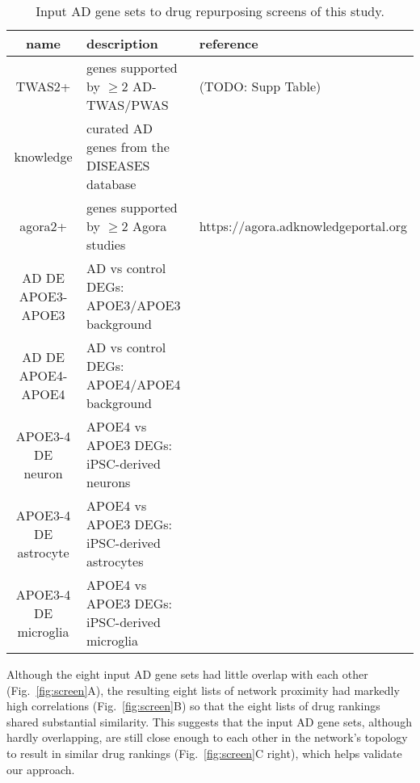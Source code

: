 \documentclass[letterpaper]{article}
\begin{document}
\begin{table}
\footnotesize
\begin{tabular}{cll}
name     & description & reference  \\
\hline
TWAS2+   & genes supported by $\ge 2$ AD-TWAS/PWAS & (TODO: Supp Table)  \\
knowledge& curated AD genes from the DISEASES database & \cite{PletscherFrankild2015} \\
agora2+  & genes supported by $\ge 2$ Agora studies & https://agora.adknowledgeportal.org \\
AD DE APOE3-APOE3 & AD vs control DEGs: APOE3/APOE3 background & \cite{Taubes2021} \\
AD DE APOE4-APOE4 & AD vs control DEGs: APOE4/APOE4 background & \cite{Taubes2021} \\
APOE3-4 DE neuron & APOE4 vs APOE3 DEGs: iPSC-derived neurons& \cite{Lin2018} \\
APOE3-4 DE astrocyte & APOE4 vs APOE3 DEGs: iPSC-derived astrocytes& \cite{Lin2018} \\
APOE3-4 DE microglia & APOE4 vs APOE3 DEGs: iPSC-derived microglia& \cite{Lin2018} \\
\end{tabular}
\caption{
Input AD gene sets to drug repurposing screens of this study.
}
\label{tab:genesets}
\end{table}

Although the eight input AD gene sets had little overlap with each other
(Fig.~\ref{fig:screen}A), the resulting eight lists of network proximity had
markedly high correlations (Fig.~\ref{fig:screen}B) so that the eight lists
of drug rankings shared substantial similarity.  This suggests that the
input AD gene sets, although hardly overlapping, are still close enough to
each other in the network's topology to result in similar drug rankings
(Fig.~\ref{fig:screen}C right), which helps validate our approach.
\end{document}
